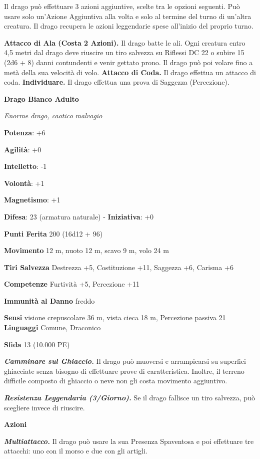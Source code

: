 \begin{multicols}{2}
Il drago può effettuare 3 azioni aggiuntive, scelte tra le opzioni
seguenti. Può usare solo un'Azione Aggiuntiva alla volta e solo al
termine del turno di un'altra creatura. Il drago recupera le azioni
leggendarie spese all'inizio del proprio turno.

\textbf{Attacco di Ala (Costa 2 Azioni).} Il drago batte le ali. Ogni
creatura entro 4,5 metri dal drago deve riuscire un tiro salvezza su Riflessi DC 22 o subire 15 (2d6 + 8) danni contundenti e venir gettato
prono. Il drago può poi volare fino a metà della sua velocità di volo.
\textbf{Attacco di Coda.} Il drago effettua un attacco di coda.
\textbf{Individuare.} Il drago effettua una prova di Saggezza
(Percezione).

\textbf{Drago Bianco Adulto}

\emph{Enorme drago, caotico malvagio}

\textbf{Potenza}: +6

\textbf{Agilità}: +0

\textbf{Intelletto}: -1

\textbf{Volontà}: +1

\textbf{Magnetismo}: +1

\textbf{Difesa}: 23 (armatura naturale) - \textbf{Iniziativa}: +0

\textbf{Punti Ferita} 200 (16d12 + 96)

\textbf{Movimento} 12 m, nuoto 12 m, scavo 9 m, volo 24 m

\textbf{Tiri Salvezza} Destrezza +5, Costituzione +11, Saggezza +6,
Carisma +6

\textbf{Competenze} Furtività +5, Percezione +11

\textbf{Immunità al Danno} freddo

\textbf{Sensi} visione crepuscolare 36 m, vista cieca 18 m, Percezione passiva
21 \textbf{Linguaggi} Comune, Draconico

\textbf{Sfida} 13 (10.000 PE)

\emph{\textbf{Camminare sul Ghiaccio.}} Il drago può muoversi e
arrampicarsi su superfici ghiacciate senza bisogno di effettuare prove
di caratteristica. Inoltre, il terreno difficile composto di ghiaccio o
neve non gli costa movimento aggiuntivo.

\emph{\textbf{Resistenza Leggendaria (3/Giorno).}} Se il drago fallisce
un tiro salvezza, può scegliere invece di riuscire.

\textbf{Azioni}

\emph{\textbf{Multiattacco.}} Il drago può usare la sua Presenza
Spaventosa e poi effettuare tre attacchi: uno con il morso e due con gli
artigli.


\end{multicols}

